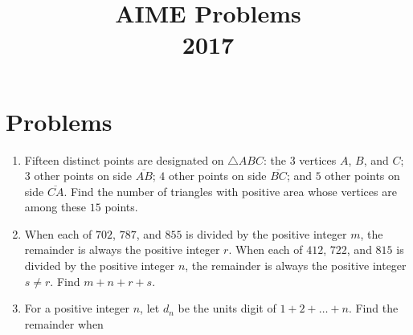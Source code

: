\documentclass{article}
\title{AIME Problems \\ 2017}
\date{}
\begin{document}
\maketitle\thispagestyle{fancy}\newpage\section*{Problems}\begin{enumerate}[label=\arabic*., itemsep=0.5em]\item Fifteen distinct points are designated on $\triangle ABC$: the 3 vertices $A$, $B$, and $C$; $3$ other points on side $\overline{AB}$; $4$ other points on side $\overline{BC}$; and $5$ other points on side $\overline{CA}$. Find the number of triangles with positive area whose vertices are among these $15$ points.\par \vspace{0.5em}\item When each of $702$, $787$, and $855$ is divided by the positive integer $m$, the remainder is always the positive integer $r$. When each of $412$, $722$, and $815$ is divided by the positive integer $n$, the remainder is always the positive integer $s \neq r$. Find $m+n+r+s$.\par \vspace{0.5em}\item For a positive integer $n$, let $d_n$ be the units digit of $1 + 2 + \dots + n$. Find the remainder when


\end{enumerate}
\end{document}
